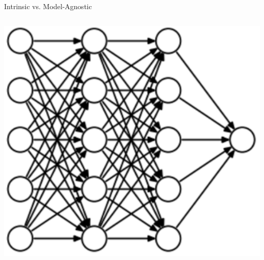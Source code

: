 \documentclass[11pt,compress,t,notes=noshow, aspectratio=169, xcolor=table]{beamer}
\begin{document}
\begin{frame}{Intrinsic vs. Model-Agnostic}
{\begin{columns}
\begin{column}{0.2\linewidth}
    \centering \includegraphics[page=1, width=\textwidth]{figure/nn_model}
    \end{column}
	\end{columns}}
		
	
	

\end{frame}
\end{document}
